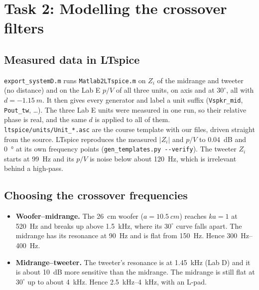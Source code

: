 \documentclass[a4paper,10pt]{article}
\newcommand{\file}[1]{\nolinkurl{#1}}
\begin{document}
\section{Task 2: Modelling the crossover filters}
\subsection{Measured data in LTspice}
\file{export_systemD.m} runs \file{Matlab2LTspice.m} on $Z_i$ of the midrange and tweeter (no distance)
and on the Lab E $p/V$ of all three units, on axis and at $30^\circ$, all with $d = \SI{-1.15}{m}$. It
then gives every generator and label a unit suffix (\file{Vspkr_mid}, \file{Pout_tw}, \dots). The three
Lab E units were measured in one run, so their relative phase is real, and the same $d$ is applied to
all of them. \file{ltspice/units/Unit_*.asc} are the course template with our files, driven straight
from the source. LTspice reproduces the measured $|Z_i|$ and $p/V$ to \SI{0.04}{dB} and \SI{0}{\degree}
at its own frequency points (\file{gen_templates.py --verify}). The tweeter $Z_i$ starts at
\SI{99}{Hz} and its $p/V$ is noise below about \SI{120}{Hz}, which is irrelevant behind a high-pass.

\subsection{Choosing the crossover frequencies}
\begin{itemize}
\item \textbf{Woofer--midrange.} The \SI{26}{cm} woofer ($a = \SI{10.5}{cm}$) reaches $ka = 1$ at
  \SI{520}{Hz} and breaks up above \SI{1.5}{kHz}, where its $30^\circ$ curve falls apart. The midrange
  has its resonance at \SI{90}{Hz} and is flat from \SI{150}{Hz}. Hence \SIrange{300}{400}{Hz}.
\item \textbf{Midrange--tweeter.} The tweeter's resonance is at \SI{1.45}{kHz} (Lab D) and it is about
  \SI{10}{dB} more sensitive than the midrange. The midrange is still flat at $30^\circ$ up to about
  \SI{4}{kHz}. Hence \SIrange{2.5}{4}{kHz}, with an L-pad.
\end{itemize}
\end{document}
